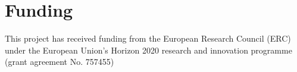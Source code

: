 \documentclass{article}
\begin{document}

\section*{Funding}

This project has received funding from the European Research Council (ERC) under the European Union’s Horizon 2020 research and innovation programme (grant agreement No. 757455)

\newpage 


\end{document}

